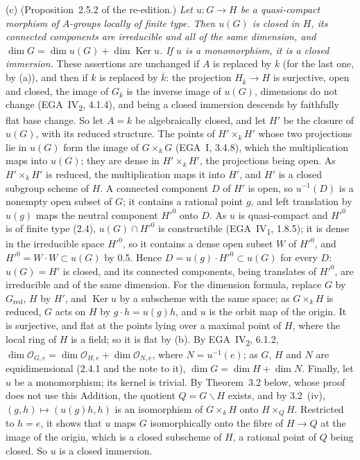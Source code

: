 (c) (Proposition~2.5.2 of the re-edition.) \emph{Let \(u\colon G\to H\) be a quasi-compact morphism
of \(A\)-groups locally of finite type. Then \(u(G)\) is closed in \(H\), its connected components
are irreducible and all of the same dimension, and
\(\dim G=\dim u(G)+\dim\operatorname{Ker}u\). If \(u\) is a monomorphism, it is a closed
immersion.} These assertions are unchanged if \(A\) is replaced by \(k\) (for the last one, by (a)),
and then if \(k\) is replaced by \(\overline k\): the projection \(H_{\overline k}\to H\) is
surjective, open and closed, the image of \(G_{\overline k}\) is the inverse image of \(u(G)\),
dimensions do not change (EGA~IV\textsubscript{2}, 4.1.4), and being a closed immersion descends by
faithfully flat base change. So let \(A=k\) be algebraically closed, and let \(H'\) be the closure of
\(u(G)\), with its reduced structure. The points of \(H'\times_kH'\) whose two projections lie in
\(u(G)\) form the image of \(G\times_kG\) (EGA~I, 3.4.8), which the multiplication maps into
\(u(G)\); they are dense in \(H'\times_kH'\), the projections being open. As \(H'\times_kH'\) is
reduced, the multiplication maps it into \(H'\), and \(H'\) is a closed subgroup scheme of \(H\). A
connected component \(D\) of \(H'\) is open, so \(u^{-1}(D)\) is a nonempty open subset of \(G\); it
contains a rational point \(g\), and left translation by \(u(g)\) maps the neutral component
\(H'^0\) onto \(D\). As \(u\) is quasi-compact and \(H'^0\) is of finite type (2.4),
\(u(G)\cap H'^0\) is constructible (EGA~IV\textsubscript{1}, 1.8.5); it is dense in the irreducible
space \(H'^0\), so it contains a dense open subset \(W\) of \(H'^0\), and \(H'^0=W\cdot W\subset u(G)\)
by 0.5. Hence \(D=u(g)\cdot H'^0\subset u(G)\) for every \(D\): \(u(G)=H'\) is closed, and its
connected components, being translates of \(H'^0\), are irreducible and of the same dimension. For
the dimension formula, replace \(G\) by \(G_{\mathrm{red}}\), \(H\) by \(H'\), and
\(\operatorname{Ker}u\) by a subscheme with the same space; as \(G\times_kH\) is reduced, \(G\) acts
on \(H\) by \(g\cdot h=u(g)h\), and \(u\) is the orbit map of the origin. It is surjective, and flat
at the points lying over a maximal point of \(H\), where the local ring of \(H\) is a field; so it is
flat by (b). By EGA~IV\textsubscript{2}, 6.1.2,
\(\dim\mathcal O_{G,e}=\dim\mathcal O_{H,e}+\dim\mathcal O_{N,e}\), where \(N=u^{-1}(e)\); as \(G\),
\(H\) and \(N\) are equidimensional (2.4.1 and the note to it),
\(\dim G=\dim H+\dim N\). Finally, let \(u\) be a monomorphism; its kernel is trivial. By
Theorem~3.2 below, whose proof does not use this Addition, the quotient \(Q=G\backslash H\) exists,
and by 3.2~(iv), \((g,h)\mapsto(u(g)h,h)\) is an isomorphism of \(G\times_kH\) onto
\(H\times_QH\). Restricted to \(h=e\), it shows that \(u\) maps \(G\) isomorphically onto the fibre
of \(H\to Q\) at the image of the origin, which is a closed subscheme of \(H\), a rational point of
\(Q\) being closed. So \(u\) is a closed immersion.

